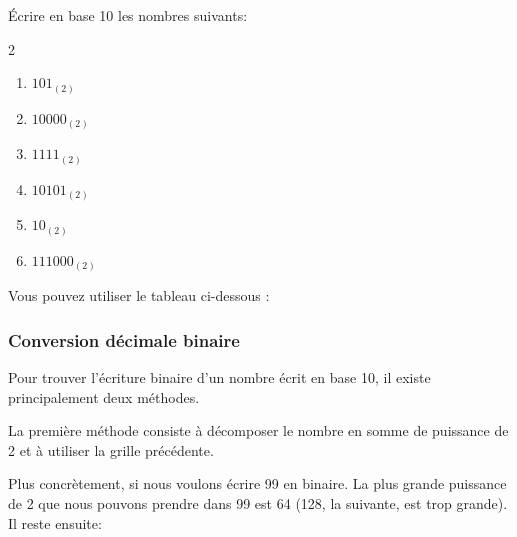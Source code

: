 \documentclass[11pt, a4paper]{book}
\begin{document}
\begin{exercice}
\'Ecrire en base 10 les nombres suivants:
\begin{multicols}{2}
\begin{enumerate}
\item $101_{(2)}$ 
\item $10 000_{(2)}$
\item $1111_{(2)}$
\item $10101_{(2)}$
\item $10_{(2)}$
\item $111 000_{(2)}$

\end{enumerate}
\end{multicols}

Vous pouvez utiliser le tableau ci-dessous : 

\begin{center}
\end{center} 

\end{exercice}

\subsubsection{Conversion décimale binaire}

Pour trouver l'écriture binaire d'un nombre écrit en base 10, il existe principalement deux méthodes. 


\; 

La première méthode consiste à décomposer le nombre en somme de puissance de 2 et à utiliser la grille précédente. 

Plus concrètement, si nous voulons écrire 99 en binaire. La plus grande puissance de 2 que nous pouvons prendre dans 99 est 64 (128, la suivante, est trop grande). Il reste ensuite: 
\end{document}
